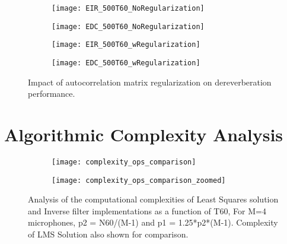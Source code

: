  \begin{figure}[H]
 	\centering
	\begin{subfigure}[b]{0.45\textwidth}
		\centering
		\texttt{[image: EIR\_500T60\_NoRegularization]}
	\end{subfigure}
	\hfill
	\begin{subfigure}[b]{0.45\textwidth}
		\centering
		\texttt{[image: EDC\_500T60\_NoRegularization]}
	\end{subfigure}

	\begin{subfigure}[b]{0.45\textwidth}
		\centering
		\texttt{[image: EIR\_500T60\_wRegularization]}
	\end{subfigure}
	\hfill
	\begin{subfigure}[b]{0.45\textwidth}
		\centering
		\texttt{[image: EDC\_500T60\_wRegularization]}
	\end{subfigure}
 	\caption{Impact of autocorrelation matrix regularization on dereverberation performance.}
 	\label{fig:params_regularization}
 \end{figure}
 
 



\section{Algorithmic Complexity Analysis}

\begin{figure}[H]
	\centering
	\begin{subfigure}[b]{0.45\textwidth}
		\centering
		\texttt{[image: complexity\_ops\_comparison]}
	\end{subfigure}
	\hfill
	\begin{subfigure}[b]{0.45\textwidth}
		\centering
		\texttt{[image: complexity\_ops\_comparison\_zoomed]}
	\end{subfigure}
	\caption{Analysis of the computational complexities of Least Squares solution and Inverse filter implementations as a function of T60, For M=4 microphones, p2 = N60/(M-1) and p1 = 1.25*p2*(M-1). Complexity of LMS Solution also shown for comparison.}
	\label{fig:complexity_operations}
\end{figure}

